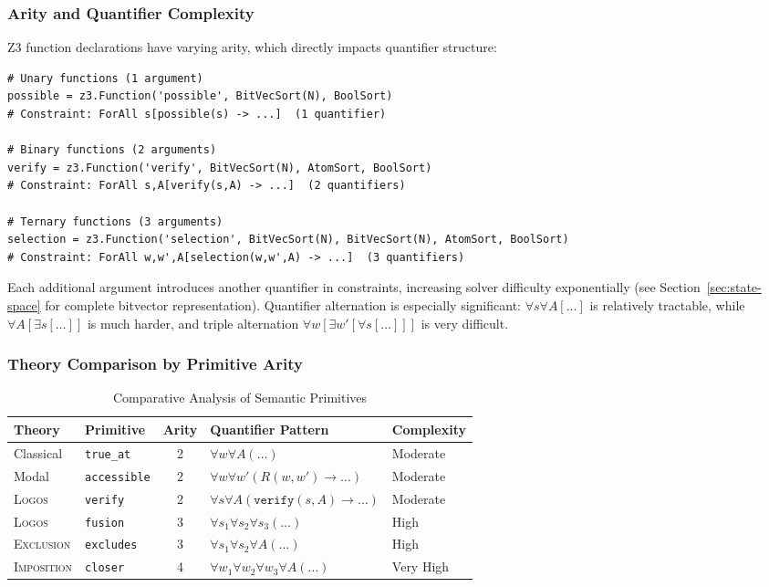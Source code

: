 \documentclass[pdflatex,sn-mathphys-num]{sn-jnl}
\newcommand{\imp}{\to}                      %
\newcommand{\theorylogos}{\textsc{Logos}}
\newcommand{\theoryexclusion}{\textsc{Exclusion}}
\newcommand{\theoryimposition}{\textsc{Imposition}}
\newcommand{\zverify}{\texttt{verify}}
\newcommand{\zaccessible}{\texttt{accessible}}
\newcommand{\zfusion}{\texttt{fusion}}
\newcommand{\zcloser}{\texttt{closer}}
\newcommand{\zexcludes}{\texttt{excludes}}
\newcommand{\ztrueat}{\texttt{true\_at}}
\theoremstyle{thmstyleone}
\theoremstyle{thmstyletwo}
\theoremstyle{thmstylethree}
\begin{document}
\subsubsection{Arity and Quantifier Complexity}

Z3 function declarations have varying arity, which directly impacts quantifier structure:

\begin{lstlisting}[caption={Primitive function arity}]
# Unary functions (1 argument)
possible = z3.Function('possible', BitVecSort(N), BoolSort)
# Constraint: ForAll s[possible(s) -> ...]  (1 quantifier)

# Binary functions (2 arguments)
verify = z3.Function('verify', BitVecSort(N), AtomSort, BoolSort)
# Constraint: ForAll s,A[verify(s,A) -> ...]  (2 quantifiers)

# Ternary functions (3 arguments)
selection = z3.Function('selection', BitVecSort(N), BitVecSort(N), AtomSort, BoolSort)
# Constraint: ForAll w,w',A[selection(w,w',A) -> ...]  (3 quantifiers)
\end{lstlisting}

Each additional argument introduces another quantifier in constraints, increasing solver difficulty exponentially (see Section~\ref{sec:state-space} for complete bitvector representation).
Quantifier alternation is especially significant: $\forall s \forall A[\ldots]$ is relatively tractable, while $\forall A[\exists s[\ldots]]$ is much harder, and triple alternation $\forall w[\exists w'[\forall s[\ldots]]]$ is very difficult.

\subsubsection{Theory Comparison by Primitive Arity}

\begin{table}[htbp]
\centering
\caption{Comparative Analysis of Semantic Primitives}
\label{tab:primitives}
\begin{tabular}{@{}llcll@{}}
\toprule
\textbf{Theory} & \textbf{Primitive} & \textbf{Arity} & \textbf{Quantifier Pattern} & \textbf{Complexity} \\
\midrule
Classical & \ztrueat{} & 2 & $\forall w \forall A(\ldots)$ & Moderate \\
Modal & \zaccessible{} & 2 & $\forall w \forall w'(R(w,w') \imp \ldots)$ & Moderate \\
\theorylogos{} & \zverify{} & 2 & $\forall s \forall A(\zverify(s,A) \imp \ldots)$ & Moderate \\
\theorylogos{} & \zfusion{} & 3 & $\forall s_1 \forall s_2 \forall s_3(\ldots)$ & High \\
\theoryexclusion{} & \zexcludes{} & 3 & $\forall s_1 \forall s_2 \forall A(\ldots)$ & High \\
\theoryimposition{} & \zcloser{} & 4 & $\forall w_1 \forall w_2 \forall w_3 \forall A(\ldots)$ & Very High \\
\bottomrule
\end{tabular}
\end{table}
\end{document}
